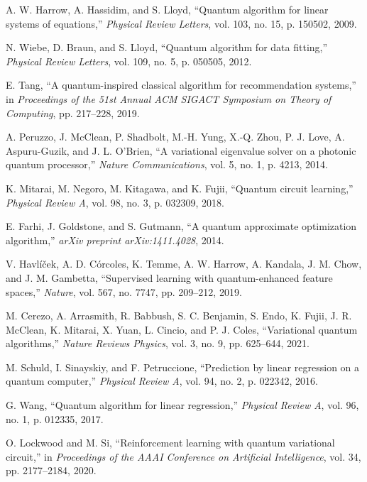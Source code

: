 \documentclass[11pt]{article}
\begin{document}

\begin{thebibliography}{50}

A. W. Harrow, A. Hassidim, and S. Lloyd, ``Quantum algorithm for linear systems of equations,'' \textit{Physical Review Letters}, vol. 103, no. 15, p. 150502, 2009.

N. Wiebe, D. Braun, and S. Lloyd, ``Quantum algorithm for data fitting,'' \textit{Physical Review Letters}, vol. 109, no. 5, p. 050505, 2012.

E. Tang, ``A quantum-inspired classical algorithm for recommendation systems,'' in \textit{Proceedings of the 51st Annual ACM SIGACT Symposium on Theory of Computing}, pp. 217--228, 2019.

A. Peruzzo, J. McClean, P. Shadbolt, M.-H. Yung, X.-Q. Zhou, P. J. Love, A. Aspuru-Guzik, and J. L. O'Brien, ``A variational eigenvalue solver on a photonic quantum processor,'' \textit{Nature Communications}, vol. 5, no. 1, p. 4213, 2014.

K. Mitarai, M. Negoro, M. Kitagawa, and K. Fujii, ``Quantum circuit learning,'' \textit{Physical Review A}, vol. 98, no. 3, p. 032309, 2018.

E. Farhi, J. Goldstone, and S. Gutmann, ``A quantum approximate optimization algorithm,'' \textit{arXiv preprint arXiv:1411.4028}, 2014.

V. Havlíček, A. D. Córcoles, K. Temme, A. W. Harrow, A. Kandala, J. M. Chow, and J. M. Gambetta, ``Supervised learning with quantum-enhanced feature spaces,'' \textit{Nature}, vol. 567, no. 7747, pp. 209--212, 2019.

M. Cerezo, A. Arrasmith, R. Babbush, S. C. Benjamin, S. Endo, K. Fujii, J. R. McClean, K. Mitarai, X. Yuan, L. Cincio, and P. J. Coles, ``Variational quantum algorithms,'' \textit{Nature Reviews Physics}, vol. 3, no. 9, pp. 625--644, 2021.

M. Schuld, I. Sinayskiy, and F. Petruccione, ``Prediction by linear regression on a quantum computer,'' \textit{Physical Review A}, vol. 94, no. 2, p. 022342, 2016.

G. Wang, ``Quantum algorithm for linear regression,'' \textit{Physical Review A}, vol. 96, no. 1, p. 012335, 2017.

O. Lockwood and M. Si, ``Reinforcement learning with quantum variational circuit,'' in \textit{Proceedings of the AAAI Conference on Artificial Intelligence}, vol. 34, pp. 2177--2184, 2020.


\end{thebibliography}
\end{document}
